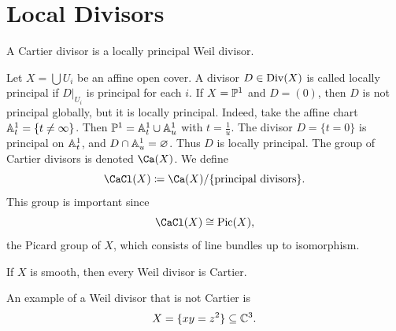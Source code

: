 
\section{Local Divisors}

\begin{definition}
    A Cartier divisor is a locally principal Weil divisor.
\end{definition}

Let $X = \bigcup U_i$ be an affine open cover.
A divisor $D\in \Div(X)$ is called locally principal if $D|_{U_i}$ is principal for each $i$.
If $X = \pp^1$ and $D = (0)$, then $D$ is not principal globally, but it is locally principal.
Indeed, take the affine chart $\aa^1_t = \{t \neq \infty\}$.
Then $\pp^1 = \aa^1_t \cup \aa^1_u$ with $t = \frac{1}{u}$.
The divisor $D = \{t = 0\}$ is principal on $\aa^1_t$, and $D \cap \aa^1_u = \varnothing$.
Thus $D$ is locally principal.
The group of Cartier divisors is denoted $\Ca(X)$.
We define
\[
    \CaCl(X) \coloneqq \Ca(X)/\{\text{principal divisors}\}.
\]
This group is important since
\[
    \CaCl(X) \cong \mathrm{Pic}(X),
\]
the Picard group of $X$, which consists of line bundles up to isomorphism.

\begin{theorem*}{
    If $X$ is smooth, then every Weil divisor is Cartier.
}
\end{theorem*}

An example of a Weil divisor that is not Cartier is
\[
    X = \{xy = z^2\} \subseteq \c^3.
\]

